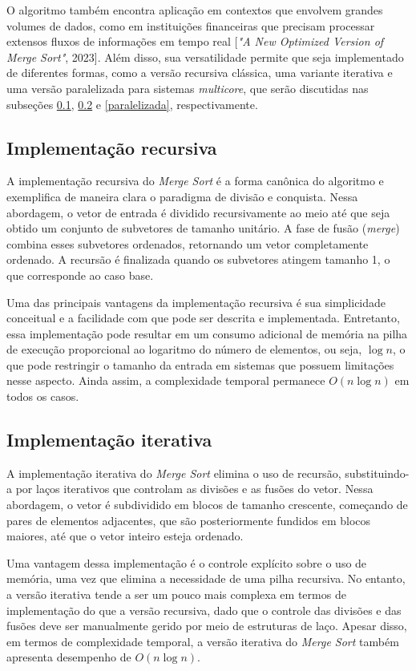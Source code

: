 \documentclass[12pt]{article}
\begin{document}
O algoritmo também encontra aplicação em contextos que envolvem grandes volumes de dados, como em instituições financeiras que precisam processar extensos fluxos de informações em tempo real [\textit{"A New Optimized Version of Merge Sort"}, 2023]. Além disso, sua versatilidade permite que seja implementado de diferentes formas, como a versão recursiva clássica, uma variante iterativa e uma versão paralelizada para sistemas \textit{multicore}, que serão discutidas nas subseções \ref{recursiva}, \ref{iterativa} e \ref{paralelizada}, respectivamente.

\subsection{Implementação recursiva}\label{recursiva}

A implementação recursiva do \textit{Merge Sort} é a forma canônica do algoritmo e exemplifica de maneira clara o paradigma de divisão e conquista. Nessa abordagem, o vetor de entrada é dividido recursivamente ao meio até que seja obtido um conjunto de subvetores de tamanho unitário. A fase de fusão (\textit{merge}) combina esses subvetores ordenados, retornando um vetor completamente ordenado. A recursão é finalizada quando os subvetores atingem tamanho 1, o que corresponde ao caso base.

Uma das principais vantagens da implementação recursiva é sua simplicidade conceitual e a facilidade com que pode ser descrita e implementada. Entretanto, essa implementação pode resultar em um consumo adicional de memória na pilha de execução proporcional ao logaritmo do número de elementos, ou seja, $\log{n}$, o que pode restringir o tamanho da entrada em sistemas que possuem limitações nesse aspecto. Ainda assim, a complexidade temporal permanece $O(n\log{n})$ em todos os casos.

\subsection{Implementação iterativa}\label{iterativa}

 A implementação iterativa do \textit{Merge Sort} elimina o uso de recursão, substituindo-a por laços iterativos que controlam as divisões e as fusões do vetor. Nessa abordagem, o vetor é subdividido em blocos de tamanho crescente, começando de pares de elementos adjacentes, que são posteriormente fundidos em blocos maiores, até que o vetor inteiro esteja ordenado.

Uma vantagem dessa implementação é o controle explícito sobre o uso de memória, uma vez que elimina a necessidade de uma pilha recursiva. No entanto, a versão iterativa tende a ser um pouco mais complexa em termos de implementação do que a versão recursiva, dado que o controle das divisões e das fusões deve ser manualmente gerido por meio de estruturas de laço. Apesar disso, em termos de complexidade temporal, a versão iterativa do \textit{Merge Sort} também apresenta desempenho de $O(n\log{n})$.
\end{document}
